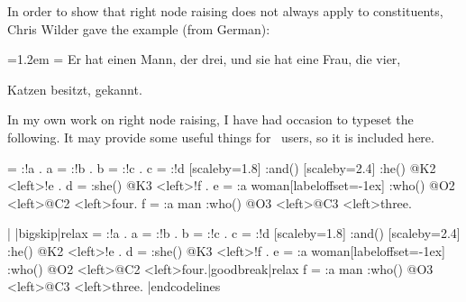 
\example

In order to show that right node raising does not always
apply to constituents, Chris Wilder gave the example (from
German):

\medskip
{\leftskip=1.2em \rightskip=\leftskip
Er hat einen Mann, der drei, und sie hat eine Frau,
   die vier,\par \hfill Katzen besitzt, gekannt.\medskip}

In my own work on right node raising, I have had occasion to
typeset the following.  It may provide some useful things for
\jTree\ users, so it is included here.

\exdisplay
{}
\hfil
\jtree[dirA=(1:-1),nodesepA=0,nodesepB=.8ex,
   arrows=->,style=arrowsA,bbadjust=right 4em]
\! = :!a {}.
\!a = :!b {}.
\!b = :!c {}.
\!c =
   :\jtlong !d [scaleby=1.8]
   :{and}() [scaleby=2.4]
   :{he}() @K2
   <left>\jtjot !e .
\!d =
   :{she}() @K3
   <left>\jtjot !f .
\!e =
   :{a woman}[labeloffset=-1ex]
   :{who}() @O2
   <left>@C2
   <left>{four}.
\!f =
   :{a man}
   :{who}() @O3
   <left>@C3
   <left>{three}.
\endjtree
\xe

\codelines
|
|bigskip|relax
\jtree[dirA=(1:-1),nodesepA=0,nodesepB=.8ex,
   arrows=->,style=arrowsA,bbadjust=right 4em]
\! = :!a {}.
\!a = :!b {}.
\!b = :!c {}.
\!c =
   :\jtlong !d [scaleby=1.8]
   :{and}() [scaleby=2.4]
   :{he}() @K2
   <left>\jtjot !e .
\!d =
   :{she}() @K3
   <left>\jtjot !f .
\!e =
   :{a woman}[labeloffset=-1ex]
   :{who}() @O2
   <left>@C2
   <left>{four}.|goodbreak|relax
\!f =
   :{a man}
   :{who}() @O3
   <left>@C3
   <left>{three}.
\endjtree|endcodelines


